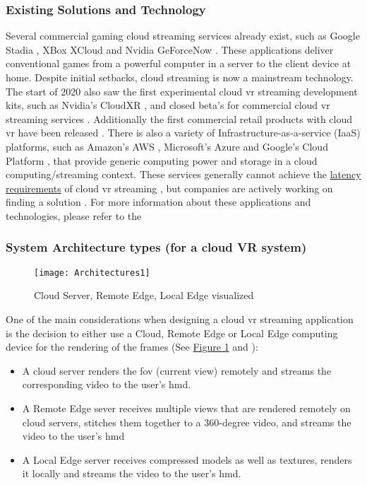 \subsubsection{Existing Solutions and Technology}
Several commercial gaming cloud streaming services already exist, such as Google Stadia \parencite{stadia}, XBox XCloud \parencite{xcloud} and Nvidia GeForceNow \parencite{geforcenow}. These applications deliver conventional games from a powerful computer in a server to the client device at home. Despite initial setbacks, cloud streaming is now a mainstream technology. The start of 2020 also saw the first experimental cloud \acrshort{vr} streaming development kits, such as Nvidia's CloudXR \parencite{cloudxr}, and closed beta's for commercial cloud \acrshort{vr} streaming services \parencite{shadowvr}. Additionally the first commercial retail products with cloud \acrshort{vr} have been released \parencite{zerolight5g}. There is also a variety of Infrastructure\hyp{}as\hyp{}a\hyp{}service (IaaS) platforms, such as Amazon's AWS \parencite{aws}, Microsoft's Azure \parencite{azure} and Google's Cloud Platform \parencite{gcp}, that provide generic computing power and storage in a cloud computing/streaming context. These services generally cannot achieve the \hyperref[ssec:vrphy]{latency requirements} of cloud \acrshort{vr} streaming \parencite{survey_IRSS}, but companies are actively working on finding a solution \parencite{awswavelength}. For more information about these applications and technologies, please refer to the 

\subsubsection{System Architecture types (for a cloud VR system)}
\begin{figure}[h]
\caption{Cloud Server, Remote Edge, Local Edge visualized \parencite{wlanvr}}
\label{fig:arch1}
\texttt{[image: Architectures1]}
\end{figure}

One of the main considerations when designing a cloud \acrshort{vr} streaming application is the decision to either use a Cloud, Remote Edge or Local Edge computing device for the rendering of the frames (See \hyperref[fig:arch1]{Figure 1} and \cite{wlanvr}):
\begin{itemize}
\item A cloud server renders the \acrfull{fov} (current view) remotely and streams the corresponding video to the user’s \acrfull{hmd}. 
\item A Remote Edge sever receives multiple views that are rendered remotely on cloud servers, stitches them together to a 360-degree video, and streams the video to the user’s \acrshort{hmd}
\item A Local Edge server receives compressed models as well as textures, renders it locally and streams the video to the user’s \acrshort{hmd}.
\end{itemize} 


